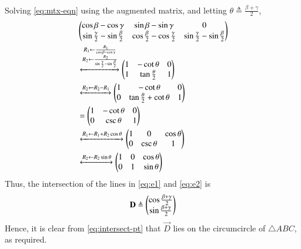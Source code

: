 \documentclass[journal,12pt,twocolumn]{IEEEtran}
\begin{document}
\begin{enumerate}
\begin{align}
        \label{eq:mtx-eqn}
    \end{align}
    Solving \eqref{eq:mtx-eqn} using the augmented matrix, and letting 
    $\theta \triangleq \frac{\beta+\gamma}{2}$,
    \begin{align}
        &\begin{pmatrix}\cos\beta-\cos\gamma&\sin\beta-\sin\gamma&0\\\sin\frac{\gamma}{2}-\sin\frac{\beta}{2}&\cos\frac{\beta}{2}-\cos\frac{\gamma}{2}&\sin\frac{\gamma}{2}-\sin\frac{\beta}{2}\end{pmatrix} \\
        &\xleftrightarrow[]{\substack{R_1\leftarrow\frac{R_1}{\cos\beta-\cos\gamma}\\R_2\leftarrow\frac{R_2}{\sin\frac{\gamma}{2}-\sin\frac{\beta}{2}}}}\begin{pmatrix}1&-\cot\theta&0\\1&\tan\frac{\theta}{2}&1\end{pmatrix} \\
        &\xleftrightarrow[]{R_2\leftarrow R_2-R_1}\begin{pmatrix}1&-\cot\theta&0\\0&\tan\frac{\theta}{2}+\cot\theta&1\end{pmatrix} \\
        &= \begin{pmatrix}1&-\cot\theta&0\\0&\csc\theta&1\end{pmatrix} \\
        &\xleftrightarrow[]{R_1\leftarrow R_1 + R_2\cos\theta}\begin{pmatrix}1&0&\cos\theta\\0&\csc\theta&1\end{pmatrix} \\
        &\xleftrightarrow[]{R_2\leftarrow R_2\sin\theta}\begin{pmatrix}1&0&\cos\theta\\0&1&\sin\theta\end{pmatrix}
        \label{eq:aug-mtx}
    \end{align}
    Thus, the intersection of the lines in \eqref{eq:e1} and \eqref{eq:e2} is
    \begin{align}
        \mathbf{D} \triangleq \begin{pmatrix}\cos\frac{\beta+\gamma}{2}\\\sin\frac{\beta+\gamma}{2}\end{pmatrix}
        \label{eq:intersect-pt}
    \end{align}
    Hence, it is clear from \eqref{eq:intersect-pt} that $\vec{D}$ lies on the 
    circumcircle of $\triangle ABC$, as required.


\end{enumerate}
\end{document}
